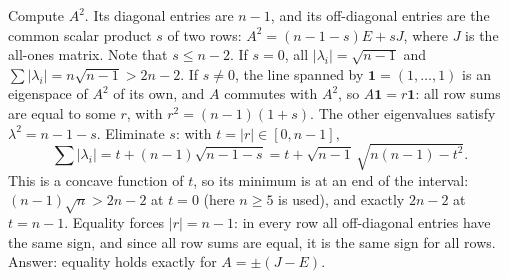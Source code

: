 \documentclass[11pt,a4paper]{article}
\begin{document}
Compute \(A^2\). Its diagonal entries are \(n-1\), and its off-diagonal entries are the common scalar product \(s\) of two rows: \(A^2=(n-1-s)E+sJ\), where \(J\) is the all-ones matrix. Note that \(s\le n-2\).
If \(s=0\), all \(|\lambda_i|=\sqrt{n-1}\) and \(\sum|\lambda_i|=n\sqrt{n-1}\gt2n-2\). If \(s\ne0\), the line spanned by \(\mathbf1=(1,\dots,1)\) is an eigenspace of \(A^2\) of its own, and \(A\) commutes with \(A^2\), so \(A\mathbf1=r\mathbf1\): all row sums are equal to some \(r\), with \(r^2=(n-1)(1+s)\). The other eigenvalues satisfy \(\lambda^2=n-1-s\).
Eliminate \(s\): with \(t=|r|\in[0,n-1]\),
\[\sum|\lambda_i|=t+(n-1)\sqrt{n-1-s}=t+\sqrt{n-1}\,\sqrt{n(n-1)-t^2}.\]
This is a concave function of \(t\), so its minimum is at an end of the interval: \((n-1)\sqrt n\gt2n-2\) at \(t=0\) (here \(n\ge5\) is used), and exactly \(2n-2\) at \(t=n-1\).
Equality forces \(|r|=n-1\): in every row all off-diagonal entries have the same sign, and since all row sums are equal, it is the same sign for all rows. Answer: equality holds exactly for \(A=\pm(J-E)\).
\end{document}
